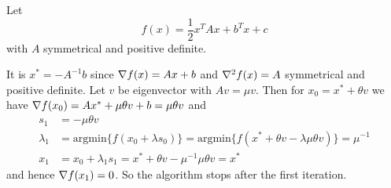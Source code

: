 \exercise{}
Let 
\[
       f(x) = \frac{1}{2} x^T{A}x + b^T x + c
\]
with \( A \) symmetrical and positive definite. 

\proof{}
It is \( x^* = -A^{-1}b \) since \( \nabla {f(x)} = Ax + b \) and \( \nabla^2 {f(x)} = A \) symmetrical and positive definite.
Let \( v \) be eigenvector with \( Av = \mu v \). Then for \( x_0 = x^* + \theta v \) we have
\( \nabla {f(x_0)} = Ax^* + \mu \theta v + b = \mu \theta v \) and
\[
    \begin{split}
        s_1                 & = -\mu \theta v \\
        \lambda_1           & = \text{argmin} \{f(x_0 + \lambda s_0)\}
                              = \text{argmin} \{f(x^* + \theta v - \lambda \mu \theta v )\} = \mu^{-1} \\
        x_1                 & = x_0 + \lambda_1 s_1 = x^* + \theta v - \mu^{-1} \mu \theta v = x^*
    \end{split}
\]
and hence \( \nabla {f(x_1)} = 0 \). So the algorithm  stops after the first iteration.
